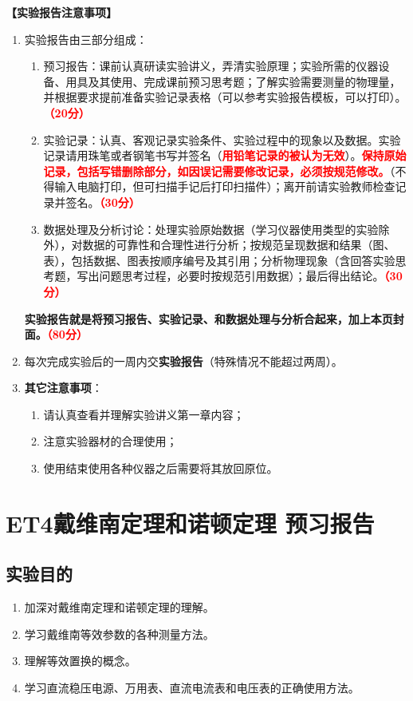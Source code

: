 \documentclass[dvipsnames, svgnames,a4paper,11pt]{article}
\begin{document}
	\textbf{【实验报告注意事项】}
	\begin{enumerate}
		\item 实验报告由三部分组成：
		\begin{enumerate}
			\item 预习报告：课前认真研读实验讲义，弄清实验原理；实验所需的仪器设备、用具及其使用、完成课前预习思考题；了解实验需要测量的物理量，并根据要求提前准备实验记录表格（可以参考实验报告模板，可以打印）。\textcolor{red}{\textbf{（20分）}}
			\item 实验记录：认真、客观记录实验条件、实验过程中的现象以及数据。实验记录请用珠笔或者钢笔书写并签名（\textcolor{red}{\textbf{用铅笔记录的被认为无效}}）。\textcolor{red}{\textbf{保持原始记录，包括写错删除部分，如因误记需要修改记录，必须按规范修改。}}（不得输入电脑打印，但可扫描手记后打印扫描件）；离开前请实验教师检查记录并签名。\textcolor{red}{\textbf{（30分）}}
			\item 数据处理及分析讨论：处理实验原始数据（学习仪器使用类型的实验除外），对数据的可靠性和合理性进行分析；按规范呈现数据和结果（图、表），包括数据、图表按顺序编号及其引用；分析物理现象（含回答实验思考题，写出问题思考过程，必要时按规范引用数据）；最后得出结论。\textcolor{red}{\textbf{（30分）}}
		\end{enumerate}
		\textbf{实验报告就是将预习报告、实验记录、和数据处理与分析合起来，加上本页封面。\textcolor{red}{（80分）}}
		\item 每次完成实验后的一周内交\textbf{实验报告}（特殊情况不能超过两周）。
		\item \textbf{其它注意事项}：
		\begin{enumerate}
			\item 请认真查看并理解实验讲义第一章内容；
			\item 注意实验器材的合理使用；
			\item 使用结束使用各种仪器之后需要将其放回原位。
		\end{enumerate}
	\end{enumerate}
	

	\clearpage
	\tableofcontents
	\clearpage
	
	
	
	
	\setcounter{section}{0}
\section{ET4戴维南定理和诺顿定理 \quad\heiti 预习报告}
	
	\subsection{实验目的}
	\begin{enumerate}
		\item 加深对戴维南定理和诺顿定理的理解。
	\item 学习戴维南等效参数的各种测量方法。
	\item 理解等效置换的概念。
	\item 学习直流稳压电源、万用表、直流电流表和电压表的正确使用方法。
	\end{enumerate}
	
\end{document}
